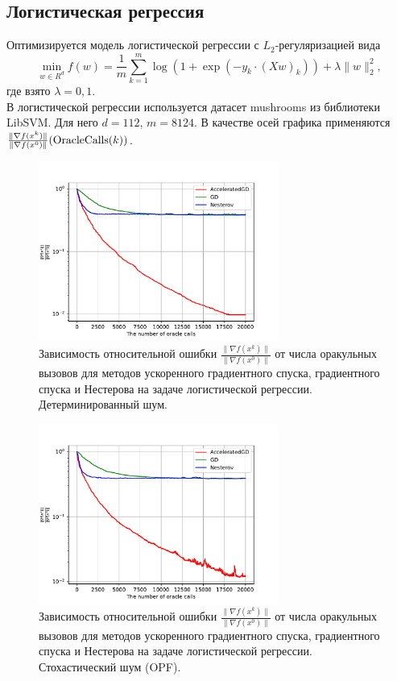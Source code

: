 \documentclass{article}
\begin{document}
\subsection{Логистическая регрессия}
Оптимизируется модель логистической регрессии с $L_2$-регуляризацией вида
\begin{equation}
 \min\limits_{w \in R^d} f(w) = \frac{1}{m}\sum\limits_{k = 1}^m \log(1 + \exp(-y_k \cdot (Xw)_k)) + \lambda \|w\|_2^2,
\end{equation}
где взято $\lambda = 0,1$.\\
В логистической регрессии используется датасет mushrooms из библиотеки LibSVM. Для него $d = 112$, $m = 8124$. В качестве осей графика применяются $\frac{\|\nabla f(x^k)\|}{\|\nabla f(x^0)\|} (\textnormal{OracleCalls}(k))$.
\begin{figure}[!htbp]
\centering
  \includegraphics[width=0.7\textwidth]{../figures/Non_stochastic_Logreg_AGD_GD_Nesterov_18_1e-06_0.0001.pdf}
 \caption{Зависимость относительной ошибки $\frac{\|\nabla f(x^k)\|}{\|\nabla f(x^0)\|}$ от числа оракульных вызовов для методов ускоренного градиентного спуска, градиентного спуска и Нестерова на задаче логистической регрессии. Детерминированный шум.}
  \label{fig:non-stochastic_logreg}
\end{figure}
\begin{figure}[!htbp]
\centering
  \includegraphics[width=0.7\textwidth]{../figures/Stochastic_Logreg_AGD_GD_Nesterov_18_1e-06_0.0001.pdf}
 \caption{Зависимость относительной ошибки $\frac{\|\nabla f(x^k)\|}{\|\nabla f(x^0)\|}$ от числа оракульных вызовов для методов ускоренного градиентного спуска, градиентного спуска и Нестерова на задаче логистической регрессии. Стохастический шум (OPF).}
  \label{fig:stochastic_logreg}
\end{figure}
\end{document}
